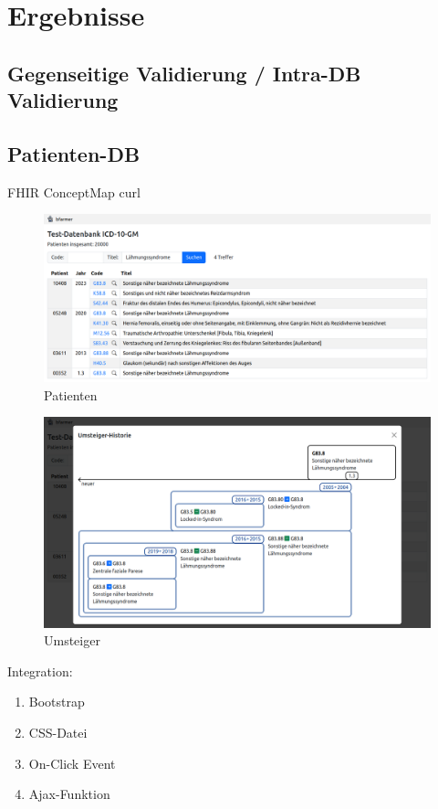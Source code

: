 \section{Ergebnisse}

\subsection{Gegenseitige Validierung / Intra-DB Validierung}

\cite{intradbvalid}

\subsection{Patienten-DB}

FHIR ConceptMap curl \cite{curl}

\begin{figure}[H]
    \centering
    \includegraphics[width=.8\linewidth]{../img/patients_screenshot.png}
    \caption{Patienten}
\end{figure}

\begin{figure}[H]
    \centering
    \includegraphics[width=.8\linewidth]{../img/umsteiger_screenshot.png}
    \caption{Umsteiger}
\end{figure}

Integration:

\begin{enumerate}
\item Bootstrap
\item CSS-Datei
\item On-Click Event
\item Ajax-Funktion
\end{enumerate}

